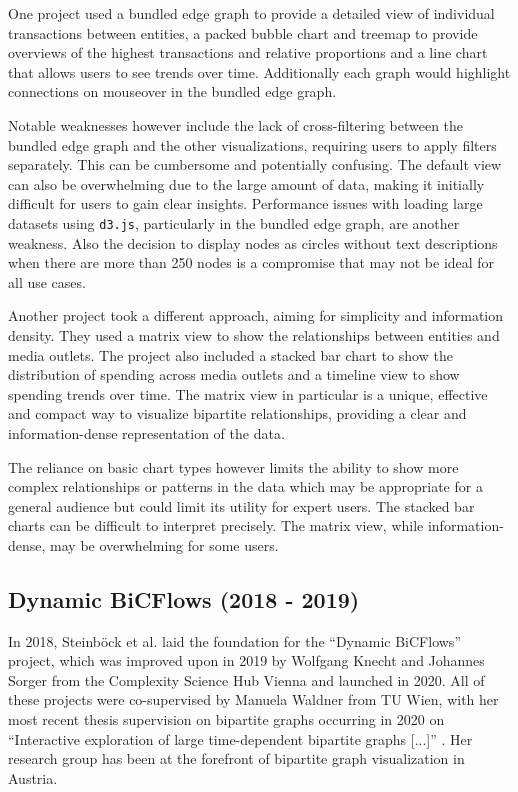 \documentclass{vgtc}
\begin{document}
\medskip

One project \cite{univie03} used a bundled edge graph to provide a detailed view of individual transactions between entities, a packed bubble chart and treemap to provide overviews of the highest transactions and relative proportions and a line chart that allows users to see trends over time. Additionally each graph would highlight connections on mouseover in the bundled edge graph.

Notable weaknesses however include the lack of cross-filtering between the bundled edge graph and the other visualizations, requiring users to apply filters separately. This can be cumbersome and potentially confusing. The default view can also be overwhelming due to the large amount of data, making it initially difficult for users to gain clear insights. Performance issues with loading large datasets using \texttt{d3.js}, particularly in the bundled edge graph, are another weakness. Also the decision to display nodes as circles without text descriptions when there are more than 250 nodes is a compromise that may not be ideal for all use cases.

\medskip

Another project \cite{univie07} took a different approach, aiming for simplicity and information density. 
They used a matrix view to show the relationships between entities and media outlets. The project also included a stacked bar chart to show the distribution of spending across media outlets and a timeline view to show spending trends over time. The matrix view in particular is a unique, effective and compact way to visualize bipartite relationships, providing a clear and information-dense representation of the data.

The reliance on basic chart types however limits the ability to show more complex relationships or patterns in the data which may be appropriate for a general audience but could limit its utility for expert users. The stacked bar charts can be difficult to interpret precisely. The matrix view, while information-dense, may be overwhelming for some users.

\subsection{Dynamic BiCFlows (2018 - 2019)}

In 2018, Steinböck et al. \cite{Steinbck2018CasualVE} laid the foundation for the ``Dynamic BiCFlows'' project, which was improved upon in 2019 by Wolfgang Knecht and Johannes Sorger from the Complexity Science Hub Vienna \cite{sorger2019immersive} and launched in 2020. All of these projects were co-supervised by Manuela Waldner from TU Wien, with her most recent thesis supervision on bipartite graphs occurring in 2020 on ``Interactive exploration of large time-dependent bipartite graphs [...]'' \cite{unger2020interactive}. Her research group has been at the forefront of bipartite graph visualization in Austria.
\end{document}
